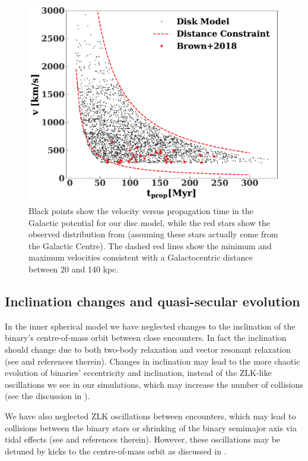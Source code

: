 \documentclass[fleqn,usenatbib]{mnras}
\begin{document}
\begin{figure}
    \includegraphics[width=\columnwidth]{figures/prop_time_disk.pdf}
    \caption{Black points show the velocity versus propagation time in the Galactic potential for our disc model, while the red stars show the observed distribution from \citet{warren_brown+2018} (assuming these stars actually come from the Galactic Centre). The dashed red lines show the minimum and maximum velocities consistent with a Galactocentric distance between 20 and 140 kpc.}
    \label{fig:tprop}
\end{figure}

\subsection{Inclination changes and quasi-secular evolution}

In the inner spherical model we have neglected changes to the inclination of the binary's centre-of-mass orbit between close encounters. In fact the inclination should change due to both two-body relaxation and vector resonant relaxation (see \citealt{hamers+2018} and references therein). Changes in inclination may lead to the more chaotic evolution of binaries' eccentricity and inclination, instead of the ZLK-like oscillations we see in our simulations, which may increase the number of collisions (see the discussion in \citealt{bradnick+2017}). 

We have also neglected ZLK oscillations between encounters, which may lead to collisions between the binary stars or shrinking of the binary semimajor axis via tidal effects (see \citealt{antonini&perets2012,prodan+2015} and references therein). However, these oscillations may be detuned by kicks to the centre-of-mass orbit as discussed in \citet{bradnick+2017}.
\end{document}
